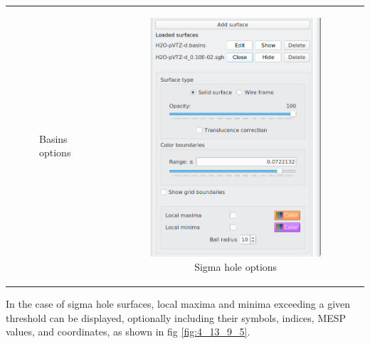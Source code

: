 \documentclass[10pt]{article}
\begin{document}
\begin{tabular}{lcr}
\begin{minipage}{.3\linewidth}
\begin{figure}[H]
\begin{center}
        \end{center}
        \vspace*{15mm}
        \caption{Basins options \label{fig:4_13_9_2}}
    \end{figure}
\end{minipage}
&
\begin{minipage}{.3\linewidth}
    \begin{figure}[H]
        \begin{center}
            \includegraphics[width=0.75\linewidth]{damqt320_sgh_menu.png} 
        \end{center}
        \vspace*{-0.5mm}
        \caption{Sigma hole options \label{fig:4_13_9_3}}
    \end{figure}
\end{minipage}
\end{tabular}
\vspace*{5mm}

In the case of sigma hole surfaces, local maxima and minima exceeding a given threshold
can be displayed, optionally including their symbols, indices, MESP values, and coordinates,
as shown in fig \ref{fig:4_13_9_5}.
\end{document}
